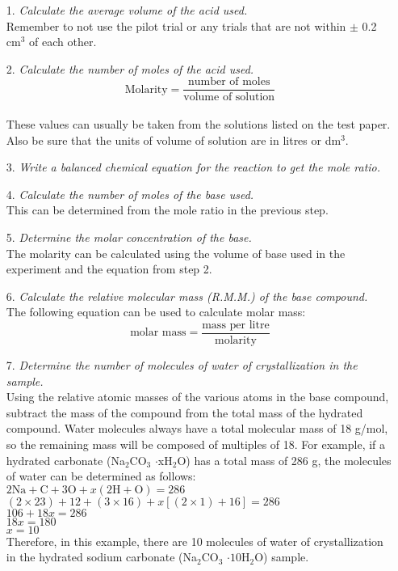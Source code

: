 \begin{enumerate}
\item[1.] \textit{Calculate the average volume of the acid used.}\\
Remember to not use the pilot trial or any trials that are not within $\pm$ 0.2 cm$^3$ of each other.
\item[2.] \textit{Calculate the number of moles of the acid used.}\\
$$\text{Molarity} = \frac{\text{number of moles}}{\text{volume of solution}}$$\\
These values can usually be taken from the solutions listed on the test paper. Also be sure that the units of volume of solution are in litres or dm$^3$.
\item[3.] \textit{Write a balanced chemical equation for the reaction to get the mole ratio.}
\item[4.] \textit{Calculate the number of moles of the base used.}\\
This can be determined from the mole ratio in the previous step.
\item[5.] \textit{Determine the molar concentration of the base.}\\
The molarity can be calculated using the volume of base used in the experiment and the equation from step 2.
\item[6.] \textit{Calculate the relative molecular mass (R.M.M.) of the base compound.}\\
The following equation can be used to calculate molar mass:\\
$$\text{molar mass} = \frac{\text{mass per litre}}{\text{molarity}}$$
\item[7.] \textit{Determine the number of molecules of water of crystallization in the sample.}\\
Using the relative atomic masses of the various atoms in the base compound, subtract the mass of the compound from the total mass of the hydrated compound. Water molecules always have a total molecular mass of 18 g/mol, so the remaining mass will be composed of multiples of 18. For example, if a hydrated carbonate (Na$_2$CO$_3$ $\cdot$xH$_2$O) has a total mass of 286 g, the molecules of water can be determined as follows:\\
$2\text{Na} + \text{C} + 3\text{O} + x(2\text{H} + \text{O}) = 286$\\
$(2 \times 23) + 12 + (3 \times 16) + x[(2 \times 1) + 16] = 286$\\
$106 + 18x = 286$\\
$18x = 180$\\
$x = 10$\\

Therefore, in this example, there are 10 molecules of water of crystallization in the hydrated sodium carbonate (Na$_2$CO$_3$ $\cdot10$H$_2$O) sample.
\end{enumerate}


